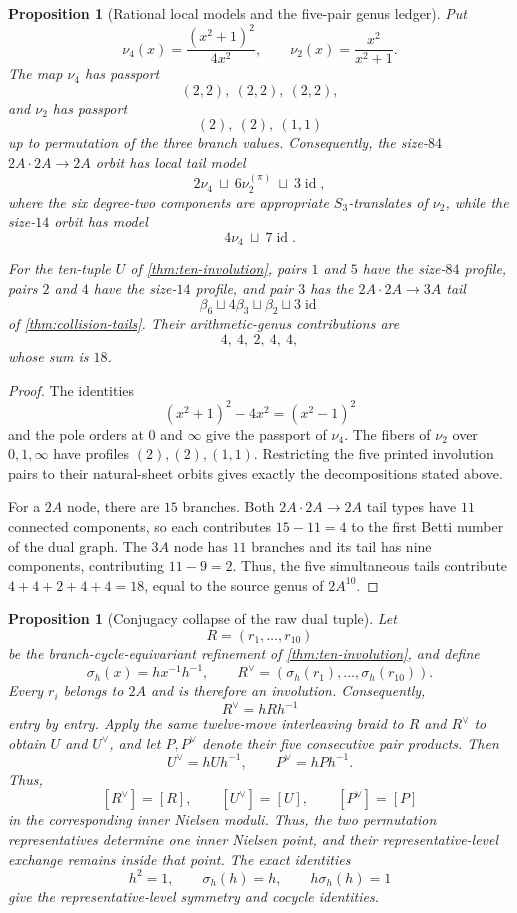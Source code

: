 \documentclass[11pt]{article}
\newtheorem{proposition}[theorem]{Proposition}
\theoremstyle{remark}
\begin{document}
\begin{proposition}[Rational local models and the five-pair genus ledger]\label{prop:five-pair-tail-ledger}
Put
\[
 \nu_4(x)=\frac{(x^2+1)^2}{4x^2},
 \qquad
 \nu_2(x)=\frac{x^2}{x^2+1}.
\]
The map $\nu_4$ has passport
\[
 (2,2),\ (2,2),\ (2,2),
\]
and $\nu_2$ has passport
\[
 (2),\ (2),\ (1,1)
\]
up to permutation of the three branch values.  Consequently, the size-$84$ $2A\cdot2A\to2A$ orbit has local tail model
\[
 2\nu_4\ \sqcup\ 6\nu_2^{(\pi)}\ \sqcup\ 3\operatorname{id},
\]
where the six degree-two components are appropriate $S_3$-translates of $\nu_2$, while the size-$14$ orbit has model
\[
 4\nu_4\ \sqcup\ 7\operatorname{id}.
\]

For the ten-tuple $U$ of \cref{thm:ten-involution}, pairs $1$ and $5$ have the size-$84$ profile, pairs $2$ and $4$ have the size-$14$ profile, and pair $3$ has the $2A\cdot2A\to3A$ tail
\[
 \beta_6\sqcup4\beta_3\sqcup\beta_2\sqcup3\operatorname{id}
\]
of \cref{thm:collision-tails}.  Their arithmetic-genus contributions are
\[
 \boxed{4,\ 4,\ 2,\ 4,\ 4,}
\]
whose sum is $18$.
\end{proposition}

\begin{proof}
The identities
\[
 (x^2+1)^2-4x^2=(x^2-1)^2
\]
and the pole orders at $0$ and $\infty$ give the passport of $\nu_4$.  The fibers of $\nu_2$ over $0,1,\infty$ have profiles $(2),(2),(1,1)$.  Restricting the five printed involution pairs to their natural-sheet orbits gives exactly the decompositions stated above.

For a $2A$ node, there are $15$ branches.  Both $2A\cdot2A\to2A$ tail types have $11$ connected components, so each contributes $15-11=4$ to the first Betti number of the dual graph.  The $3A$ node has $11$ branches and its tail has nine components, contributing $11-9=2$.  Thus, the five simultaneous tails contribute $4+4+2+4+4=18$, equal to the source genus of $2A^{10}$.
\end{proof}

\begin{proposition}[Conjugacy collapse of the raw dual tuple]
\label{prop:dual-conjugacy-collapse}
Let
\[
 R=(r_1,\ldots,r_{10})
\]
be the branch-cycle-equivariant refinement of
\cref{thm:ten-involution}, and define
\[
 \sigma_h(x)=h x^{-1}h^{-1},
 \qquad
 R^\vee=(\sigma_h(r_1),\ldots,\sigma_h(r_{10})).
\]
Every $r_i$ belongs to $2A$ and is therefore an involution.  Consequently,
\[
 \boxed{R^\vee=hRh^{-1}}
\]
entry by entry.  Apply the same twelve-move interleaving braid to $R$ and $R^\vee$ to obtain $U$ and $U^\vee$, and let $P,P^\vee$ denote their five consecutive pair products.  Then
\[
 \boxed{U^\vee=hUh^{-1},\qquad P^\vee=hPh^{-1}.}
\]
Thus,
\[
 [R^\vee]=[R],\qquad [U^\vee]=[U],\qquad [P^\vee]=[P]
\]
in the corresponding inner Nielsen moduli.  Thus, the two permutation representatives determine one inner Nielsen point, and their representative-level exchange remains inside that point.  The exact identities
\[
 h^2=1,
 \qquad
 \sigma_h(h)=h,
 \qquad
 h\sigma_h(h)=1
\]
give the representative-level symmetry and cocycle identities.
\end{proposition}
\end{document}
